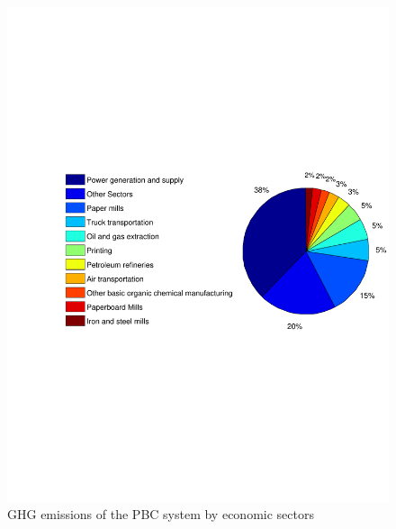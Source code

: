\documentclass[3p,times,procedia]{elsarticle}
\begin{document}
\begin{figure}[t]
\includegraphics[width=\linewidth]{f.pdf}
\caption{GHG emissions of the PBC system by economic sectors}
\label{screecn3Sectors}
\endminipage\hfill
{}

\end{figure}
\end{document}
